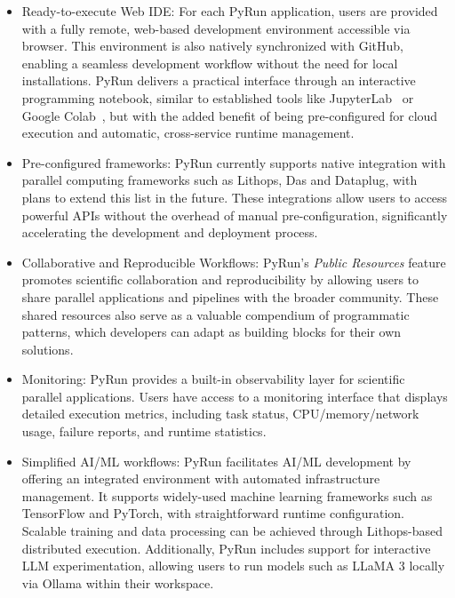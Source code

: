 \begin{itemize}

\item Ready-to-execute Web IDE: For each PyRun application, users are provided with a fully remote, web-based development environment accessible via browser. This environment is also natively synchronized with GitHub, enabling a seamless development workflow without the need for local installations. PyRun delivers a practical interface through an interactive programming notebook, similar to established tools like JupyterLab~\citep{jupyter} or Google Colab~\citep{colab}, but with the added benefit of being pre-configured for cloud execution and automatic, cross-service runtime management.

\item Pre-configured frameworks: PyRun currently supports native integration with parallel computing frameworks such as Lithops, Das and Dataplug, with plans to extend this list in the future. These integrations allow users to access powerful APIs without the overhead of manual pre-configuration, significantly accelerating the development and deployment process.

\item Collaborative and Reproducible Workflows: PyRun's \textit{Public Resources} feature promotes scientific collaboration and reproducibility by allowing users to share parallel applications and pipelines with the broader community. These shared resources also serve as a valuable compendium of programmatic patterns, which developers can adapt as building blocks for their own solutions.

\item Monitoring: PyRun provides a built-in observability layer for scientific parallel applications. Users have access to a monitoring interface that displays detailed execution metrics, including task status, CPU/memory/network usage, failure reports, and runtime statistics.

\item Simplified AI/ML workflows: PyRun facilitates AI/ML development by offering an integrated environment with automated infrastructure management. It supports widely-used machine learning frameworks such as TensorFlow and PyTorch, with straightforward runtime configuration. Scalable training and data processing can be achieved through Lithops-based distributed execution. Additionally, PyRun includes support for interactive LLM experimentation, allowing users to run models such as LLaMA 3 locally via Ollama within their workspace.
\end{itemize}


